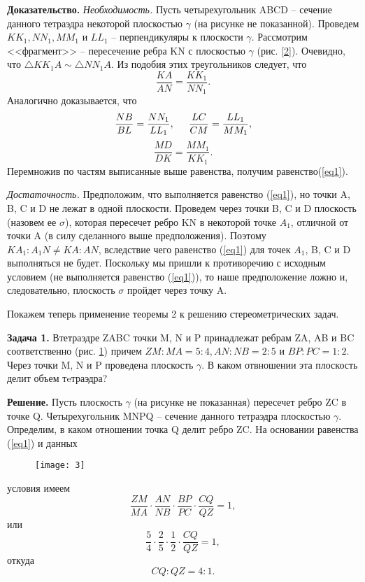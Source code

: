 \begin{multicols}{3}
	\textbf{Доказательство.} \textit{Необходимость.} Пусть четырехугольник ABCD -- сечение данного тетраэдра некоторой плоскостью $\gamma$ (на рисунке не показанной). Проведем $KK_1, NN_1, MM_1 \text{ и } LL_1$ -- перпендикуляры к плоскости $\gamma$. Рассмотрим <<фрагмент>> -- пересечение ребра KN с плоскостью $\gamma$ (рис. \ref{2}). Очевидно, что $\bigtriangleup KK_1A \sim\bigtriangleup NN_1A$. Из подобия этих треугольников следует, что
	\[\frac{KA}{AN} = \frac{KK_1}{NN_1}.\]
	Аналогично доказывается, что
	\[\frac{NB}{BL} = \frac{NN_1}{LL_1},\hspace{5mm} \frac{LC}{CM} = \frac{LL_1}{MM_1},\] \[\frac{MD}{DK} = \frac{MM_1}{KK_1}.\]
	Перемножив по частям выписанные выше равенства, получим равенство(\ref{eq1}).
	
	\textit{Достаточность.} Предположим, что выполняется равенство (\ref{eq1}), но точки A, B, C и D не лежат в одной плоскости. Проведем через точки B, C и D плоскость (назовем ее $\sigma$), которая пересечет ребро KN в некоторой точке $A_1$, отличной от точки A (в силу сделанного выше предположения). Поэтому $KA_1 : A_1N \neq KA : AN$, вследствие чего равенство (\ref{eq1}) для точек $A_1$, B, C и D выполняться не будет. Поскольку мы пришли к противоречию с исходным условием (не выполняется равенство (\ref{eq1})), то наше предположение ложно и, следовательно, плоскость $\sigma$ пройдет через точку A.
		
	Покажем теперь применение теоремы 2 к решению стереометрических задач.
		
	\textbf{Задача 1.} Втетраэдре ZABC точки M, N и P принадлежат ребрам ZA, AB и BC соответственно (рис. \ref{3}) причем $ZM : MA = 5 : 4, AN : NB = 2 : 5 \text{ и } BP : PC = 1 : 2$. Через точки M, N и P проведена плоскость $\gamma$. В каком отвношении эта плоскость делит объем тeтраэдра?

	\textbf{Решение.} Пусть плоскость $\gamma$ (на рисунке не показанная) пересечет ребро ZC в точке Q. Четырехугольник MNPQ -- сечение данного тетраэдра плоскостью  $\gamma$. Определим, в каком отношении точка Q делит ребро ZC. На основании равенства (\ref{eq1}) и данных 
	\begin{figure}[H]
		\begin{minipage}{\linewidth}
				\centering
				\texttt{[image: 3]}
				\caption{}
				\label{3}
			\end{minipage}
	\end{figure}
	условия имеем
	\[\frac{ZM}{MA} \cdot \frac{AN}{NB} \cdot \frac{BP}{PC} \cdot \frac{CQ}{QZ} = 1,\]
	или 
	\[\frac{5}{4} \cdot \frac{2}{5} \cdot \frac{1}{2} \cdot \frac{CQ}{QZ} = 1,\]
	откуда
	\[CQ : QZ = 4 : 1.\]
	

\end{multicols}
